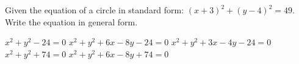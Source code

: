 \documentclass[11pt]{exam}
\begin{document}
\begin{questions}
\begin{minipage}{\linewidth}
\begin{choices}
	\choice {}
	\choice {}
	\choice {}
	\CorrectChoice {}
\end{choices} \answerline
\vspace{0.5in}

\end{minipage}
\begin{minipage}{\linewidth}
\question[3] Given the equation of a circle in standard form: $(x + 3)^2 + (y - 4)^2 = 49$. Write the equation in general form.
\vspace{1ex}
\begin{choices}
	\choice $x^2+y^2-24=0$
	\CorrectChoice $x^2+y^2+6x-8y-24=0$
	\choice $x^2+y^2+3x-4y-24=0$
	\choice $x^2+y^2+74 = 0$
	\choice $x^2+y^2+6x-8y+74=0$
\end{choices} \answerline
\vspace{0.5in}

\end{minipage}
\end{questions}
\end{document}
